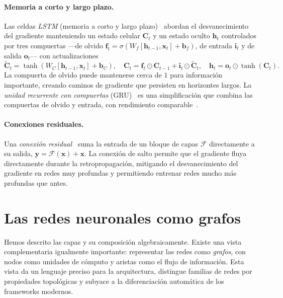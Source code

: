 \paragraph{Memoria a corto y largo plazo.}
Las celdas \emph{LSTM} (memoria a corto y largo plazo)~\citep{hochreiter1997long}
abordan el desvanecimiento del gradiente manteniendo un estado celular
$\mathbf{C}_t$ y un estado oculto $\mathbf{h}_t$ controlados por tres compuertas
---de olvido $\mathbf{f}_t = \sigma(W_f [\mathbf{h}_{t-1}, \mathbf{x}_t] +
\mathbf{b}_f)$, de entrada $\mathbf{i}_t$ y de salida $\mathbf{o}_t$--- con
actualizaciones
\[
  \tilde{\mathbf{C}}_t = \tanh(W_C [\mathbf{h}_{t-1}, \mathbf{x}_t] + \mathbf{b}_C),
  \quad \mathbf{C}_t = \mathbf{f}_t \odot \mathbf{C}_{t-1} + \mathbf{i}_t \odot \tilde{\mathbf{C}}_t,
  \quad \mathbf{h}_t = \mathbf{o}_t \odot \tanh(\mathbf{C}_t).
\]
La compuerta de olvido puede mantenerse cerca de $1$ para informaci\'on
importante, creando caminos de gradiente que persisten en horizontes largos. La
\emph{unidad recurrente con compuertas} (GRU)~\citep{cho2014learning} es una
simplificaci\'on que combina las compuertas de olvido y entrada, con rendimiento
comparable~\citep{chung2014empirical}.

\paragraph{Conexiones residuales.}
Una \emph{conexi\'on residual}~\citep{he2016deep} suma la entrada de un bloque de
capas $\mathcal{F}$ directamente a su salida, $\mathbf{y} = \mathcal{F}(\mathbf{x})
+ \mathbf{x}$. La conexi\'on de salto permite que el gradiente fluya directamente
durante la retropropagaci\'on, mitigando el desvanecimiento del gradiente en redes
muy profundas y permitiendo entrenar redes mucho m\'as profundas que antes.

\section{Las redes neuronales como grafos}
\label{sec:found:nets-as-graphs}

Hemos descrito las capas y su composici\'on algebraicamente. Existe una vista
complementaria igualmente importante: representar las redes como \emph{grafos}, con
nodos como unidades de c\'omputo y aristas como el flujo de informaci\'on. Esta
vista da un lenguaje preciso para la arquitectura, distingue familias de redes por
propiedades topol\'ogicas y subyace a la diferenciaci\'on autom\'atica de los
frameworks modernos.

